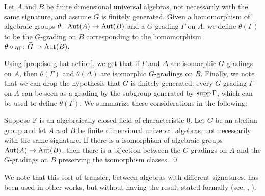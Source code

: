 \begin{defi}
    Let $A$ and $B$ be finite dimensional universal algebras, not necessarily with the same signature, and assume $G$ is finitely generated.  
    Given a homomorphism of algebraic groups $\theta\colon \operatorname{Aut}(A) \to \operatorname{Aut}(B)$ and a $G$-grading $\Gamma$ on $A$, we define $\theta(\Gamma)$ to be the $G$-grading on $B$ corresponding to the homomorphism $\theta \circ \eta_\Gamma\colon \widehat G \to \operatorname{Aut}(B)$. 
\end{defi}

Using \cref{prop:iso-g-hat-action}, we get that if $\Gamma$ and $\Delta$ are isomorphic $G$-gradings on $A$, then $\theta(\Gamma)$ and $\theta(\Delta)$ are isomorphic $G$-gradings on $B$. 
Finally, we note that we can drop the hypothesis that $G$ is finitely generated: every $G$-grading $\Gamma$ on $A$ can be seen as a grading by the subgroup generated by $\operatorname{supp} \Gamma$, which can be used to define $\theta (\Gamma)$. 
We summarize these considerations in the following: 

\begin{thm}\label{thm:transfer-of-gradings}
    Suppose $\mathbb{F}$ is an algebraically closed field of characteristic $0$. 
    Let $G$ be an abelian group and let $A$ and $B$ be finite dimensional universal algebras, not necessarily with the same signature. 
    If there is a isomorphism of algebraic groups $\operatorname{Aut}(A) \to \operatorname{Aut}(B)$, then there is a bijection between the $G$-gradings on $A$ and the $G$-gradings on $B$ preserving the isomorphism classes. \qed
\end{thm}

We note that this sort of transfer, between algebras with different signatures, has been used in other works, but without having the result stated formally (see, \eg,  \cite[Remark 1.40]{livromicha}).

